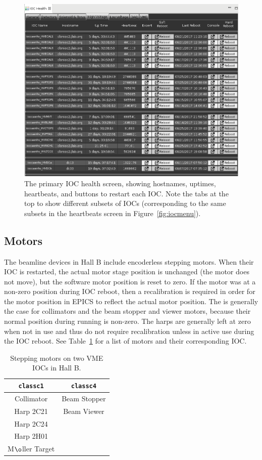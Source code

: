 \documentclass[amsmath,amssymb,notitlepage,11pt]{revtex4}
\begin{document}
\begin{figure}[htbp]\centering
  \includegraphics[width=\textwidth]{pics/iochealth}
  \caption{The primary IOC health screen, showing hostnames, uptimes, heartbeats, and buttons to restart each IOC.  Note the tabs at the top to show different subsets of IOCs (corresponding to the same subsets in the heartbeats screen in Figure~\ref{fig:iocmenu}).\label{fig:iochealth}}
\end{figure}

\subsection{Motors}
The beamline devices in Hall B include encoderless stepping motors.  When their IOC is restarted, the actual motor stage position is unchanged (the motor does not move), but the software motor position is reset to zero.  If the motor was at a non-zero position during IOC reboot, then a recalibration is required in order for the motor position in EPICS to reflect the actual motor position.  The is generally the case for collimators and the beam stopper and viewer motors, because their normal position during running is non-zero.  The harps are generally left at zero when not in use and thus do not require recalibration unless in active use during the IOC reboot.  See Table~\ref{tab:stepmot} for a list of motors and their corresponding IOC.

\begin{table}[htpb]\centering
  \begin{tabular}{|c|c|} \hline
    \texttt{classc1} & \texttt{classc4} \\ \hline
    Collimator       & Beam Stopper \\
    Harp 2C21        & Beam Viewer \\
    Harp 2C24        & \\
    Harp 2H01        & \\
    M$\o$ller Target & \\ \hline
  \end{tabular}
  \caption{Stepping motors on two VME IOCs in Hall B.\label{tab:stepmot}}  
\end{table}
\end{document}
